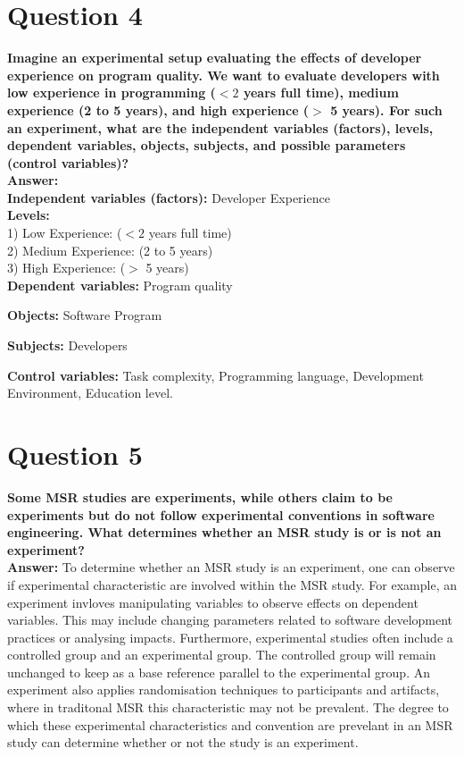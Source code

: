 \documentclass[conference]{IEEEtran}
\begin{document}
\section{Question 4}

\textbf{Imagine an experimental setup evaluating the effects of developer experience on program quality. We want to evaluate developers with low experience in programming ($<2$ years full time), medium experience (2 to 5 years), and high experience ($>$ 5 years). For such an experiment, what are the independent variables (factors), levels, dependent variables, objects, subjects, and possible parameters (control variables)?}\\

\textbf{Answer:} \\

\textbf{Independent variables (factors):} Developer Experience\\

\textbf{Levels:} \\
1) Low Experience: ($<2$ years full time)\\
2) Medium Experience: (2 to 5 years)\\
3) High Experience: ($>$ 5 years)\\

\textbf{Dependent variables:}  Program quality

\textbf{Objects:} Software Program

\textbf{Subjects:} Developers

\textbf{Control variables:} Task complexity, Programming language, Development Environment, Education level.

\section{Question 5}

\textbf{Some MSR studies are experiments, while others claim to be experiments but do not follow experimental conventions in software engineering. What determines whether an MSR study is or is not an experiment?}\\

\textbf{Answer:} To determine whether an MSR study is an experiment, one can observe if experimental characteristic are involved within the MSR study. For example, an experiment invloves manipulating variables to observe effects on dependent variables. This may include changing parameters related to software development practices or analysing impacts. Furthermore, experimental studies often include a controlled group and an experimental group. The controlled group will remain unchanged to keep as a base reference parallel to the experimental group. An experiment also applies randomisation techniques to participants and artifacts, where in traditonal MSR this characteristic may not be prevalent. The degree to which these experimental characteristics and convention are prevelant in an MSR study can determine whether or not the study is an experiment.
\end{document}

